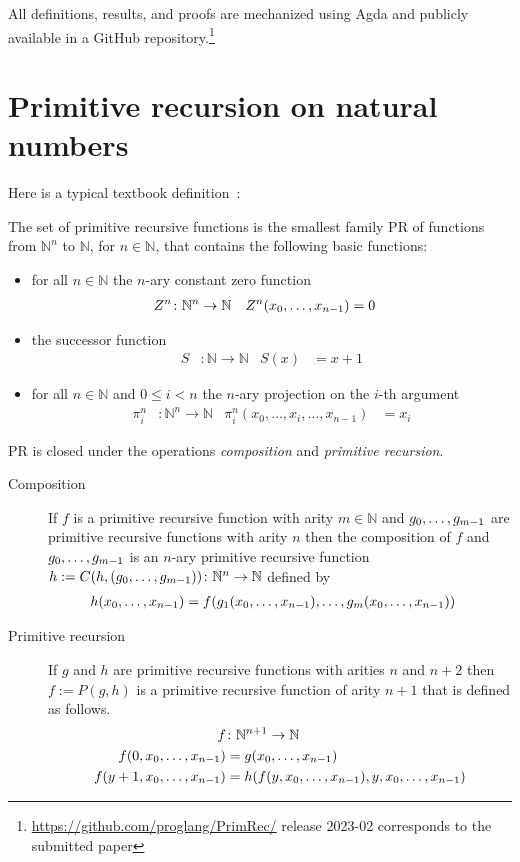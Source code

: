 \documentclass[a4paper,USenglish,cleveref, autoref, thm-restate]{lipics-v2021}
\begin{document}
All definitions, results, and proofs are mechanized using Agda and
publicly available in a GitHub
repository.\footnote{\url{https://github.com/proglang/PrimRec/}
  release 2023-02 corresponds to the submitted paper} 

\section{Primitive recursion on natural numbers}
\label{sec:prim-recurs-natur}


Here is a typical textbook definition~\cite{martin2019logik,wiki:Primitive_recursive_function}:


The set of primitive recursive functions is the smallest family PR of functions
from ${ℕ}^n$  to ${ℕ}$, for $n\in {ℕ}$, that contains the following
basic functions:
\begin{itemize}
\item for all $n\in {ℕ}$ the $n$-ary constant zero function
  \begin{align*}
	Z^n  &\colon \mathbb{N}^n \rightarrow \mathbb{N}  &
	Z^n    ({x}_0,\dots,{x}_{n-1}) &= 0  
  \end{align*}
\item the successor function
  \begin{align*}
	S &\colon \mathbb{N} \rightarrow \mathbb{N} &
	S  (x)  &=  x + 1
  \end{align*}
\item for all $n\in {ℕ}$ and $0\le i< n$ the $n$-ary projection on
  the $i$-th argument
\begin{align*}
	\pi^{n}_{i} &\colon \mathbb{N}^n \rightarrow \mathbb{N} &
	\pi^{n}_{i}  (x_0,\dots,x_i,\dots,x_{n-1})  &= x_i
\end{align*}
\end{itemize}
PR is closed under the operations \emph{composition} and \emph{primitive recursion}.
\begin{description}
\item[Composition] 
If $f$ is a primitive recursive function with arity $m \in {ℕ}$ and
${g}_0,\dots,{g}_{m-1}$ are primitive recursive functions with arity $n$ then
the composition of $f$ and ${g}_0,\dots,{g}_{m-1}$ is an $n$-ary primitive recursive function
$h := C (h,({g}_0,\dots,{g}_{m-1})) \colon \mathbb{N}^n \rightarrow \mathbb{N} $ defined by
\begin{align*}
	h  ({x}_0,\dots,{x}_{n-1})  &= f (g_1({x}_0,\dots,{x}_{n-1}),\dots,g_m({x}_0,\dots,{x}_{n-1})) 
\end{align*}

\item[Primitive recursion] 
If $g$ and $h$ are primitive recursive functions with arities $n$ and
$n+2$ then $f := P (g,h)$ is a primitive recursive function of arity $n+1$ that is defined as follows.
\begin{align*}
	f&\colon \mathbb{N}^{n+1} \rightarrow \mathbb{N} \\
	f  (0,{x}_0,\dots,{x}_{n-1})  &= g ({x}_0,\dots,{x}_{n-1}) \\
	f  (y + 1,{x}_0,\dots,{x}_{n-1}) &= h(  f(y,{x}_0,\dots,{x}_{n-1}),y,{x}_0,\dots,{x}_{n-1})
\end{align*}

\end{description}
\end{document}
